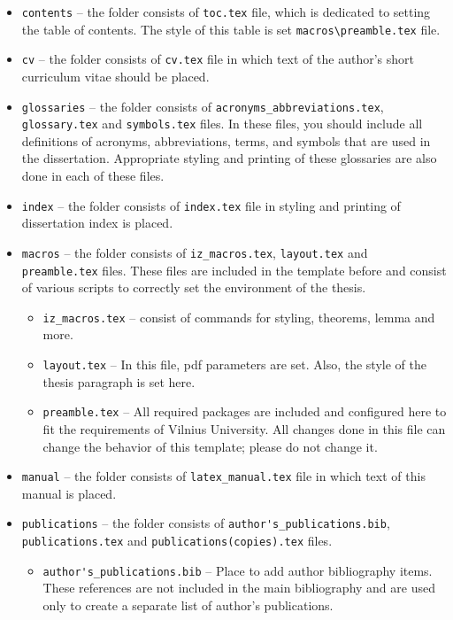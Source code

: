 \begin{itemize}
    \item \verb|contents| -- the folder consists of \verb|toc.tex| file, which is dedicated to setting the table of contents. The style of this table is set \verb|macros\preamble.tex| file.
    \item \verb|cv| -- the folder consists of \verb|cv.tex| file in which text of the author's short curriculum vitae should be placed.
    \item \verb|glossaries| -- the folder consists of \verb|acronyms_abbreviations.tex|, \verb|glossary.tex| and \verb|symbols.tex| files. In these files, you should include all definitions of acronyms, abbreviations, terms, and symbols that are used in the dissertation. Appropriate styling and printing of these glossaries are also done in each of these files.
    \item \verb|index| -- the folder consists of \verb|index.tex| file in styling and printing of dissertation index is placed.
    \item \verb|macros| -- the folder consists of \verb|iz_macros.tex|, \verb|layout.tex| and \verb|preamble.tex| files. These files are included in the template before \verb|| and consist of various scripts to correctly set the environment of the thesis. 
        \begin{itemize}
            \item \verb|iz_macros.tex| -- consist of commands for styling, theorems, lemma and more.
            \item \verb|layout.tex| -- In this file, pdf parameters are set. Also, the style of the thesis paragraph is set here.
            \item \verb|preamble.tex| -- All required packages are included and configured here to fit the requirements of Vilnius University. All changes done in this file can change the behavior of this template; please do not change it.
        \end{itemize}
    \item \verb|manual| -- the folder consists of \verb|latex_manual.tex| file in which text of this manual is placed.
    \item \verb|publications| -- the folder consists of \verb|author's_publications.bib|, \verb|publications.tex| and \verb|publications(copies).tex| files. 
        \begin{itemize}
            \item \verb|author's_publications.bib| -- Place to add author bibliography items. These references are not included in the main bibliography and are used only to create a separate list of author's publications.

\end{itemize}
\end{itemize}
